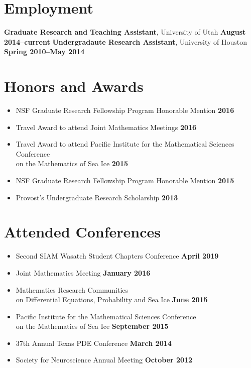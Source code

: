 \documentclass[margin,line]{res}
\begin{document}
\begin{resume}
\section{\sc Employment}
{\bf Graduate Research and Teaching Assistant}, University of Utah \hfill {\bf August 2014--current}
{\bf Undergradaute Research Assistant}, University of Houston \hfill {\bf Spring 2010--May 2014}

\section{\sc Honors and Awards}
\begin{itemize}
    \item[] NSF Graduate Research Fellowship Program Honorable Mention \hfill {\bf 2016}
    \item[] Travel Award to attend Joint Mathematics Meetings \hfill {\bf 2016}
    \item[] Travel Award to attend Pacific Institute for the Mathematical Sciences Conference\\ on the Mathematics of Sea Ice \hfill {\bf 2015}
    \item[] NSF Graduate Research Fellowship Program Honorable Mention \hfill {\bf 2015}
    \item[] Provost's Undergraduate Research Scholarship \hfill {\bf 2013}
\end{itemize}
\ifx\nopubs\undefined

\else
\fi

\section{\sc Attended Conferences}
\begin{itemize}
\item[] Second SIAM Wasatch Student Chapters Conference
\hfill {\bf April 2019}
\item[] Joint Mathematics Meeting
\hfill {\bf January 2016}
\item[] Mathematics Research Communities \\ on Differential Equations, Probability and Sea Ice 
 \hfill {\bf June 2015}
\item[] Pacific Institute for the Mathematical Sciences Conference \\ on the Mathematics of Sea Ice
  \hfill {\bf September 2015}
\item[] 37th Annual Texas PDE Conference
\hfill {\bf March 2014}
\item[] Society for Neuroscience Annual Meeting
\hfill {\bf October 2012}
\end{itemize}


\end{resume}
\end{document}
